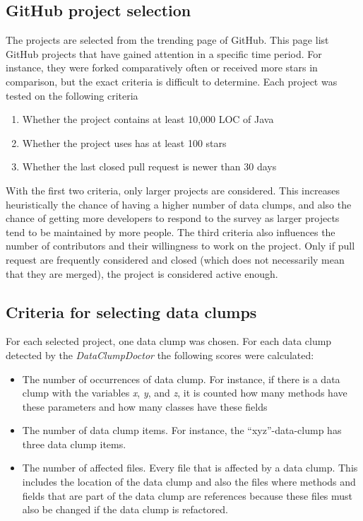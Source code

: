 \subsection{GitHub project selection}
The projects are selected from the trending page of GitHub. This page list GitHub projects that have gained attention in a specific time period. For instance, they were forked comparatively often or received more stars in comparison, but the exact criteria is difficult to determine. Each project was tested on the following criteria
\begin{enumerate}
    \item Whether the project contains at least  10,000 \ac{LOC} of Java
        \item Whether the project uses has at least 100 stars
    \item Whether the last closed pull request is newer than 30 days

\end{enumerate}

With the first two criteria,  only larger projects are considered. This increases heuristically the chance of having a higher number of data clumps, and also the chance of getting more developers to respond to the survey as larger projects tend to be maintained by more people. The third criteria also influences the number of contributors and their willingness to work on the project. Only if pull request are frequently considered and closed (which does not necessarily mean that they are merged), the project is considered active enough. 


\subsection{Criteria for selecting data clumps}

For each selected project, one data clump was chosen. For each data clump detected by the \textit{DataClumpDoctor} the following scores were calculated:
\begin{itemize}
    \item The number of occurrences of data clump. For instance, if there is a data clump with the variables \textit{x}, \textit{y}, and  \textit{z}, it is counted how many methods have these parameters and how many classes have these fields

     \item The number of data clump items. For instance, the \enquote{xyz}-data-clump has three data clump items.
     
    \item The number of affected files. Every file that is affected by a data clump. This includes the location of the data clump and also the files where methods and fields that are part of the data clump are references because these files must also be changed if the data clump is refactored. 
    
\end{itemize}

